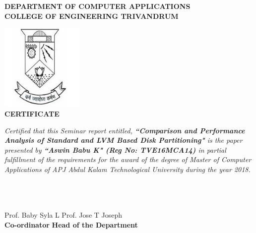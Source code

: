 \begin{titlepage}
\begin{center}
\textbf{DEPARTMENT OF COMPUTER APPLICATIONS}\\[0.5cm]
\textbf{ COLLEGE OF ENGINEERING TRIVANDRUM}\\
[0.5cm]
\vspace{1.2cm}

\includegraphics[width=0.30\textwidth]{./logo}\\
\vspace{0.8cm}
\textbf{CERTIFICATE}\\
\end{center}

\emph{Certified that this Seminar report entitled,
\textbf{``Comparison and Performance Analysis of Standard and LVM Based Disk
Partitioning"} is the paper presented by \textbf{``Aswin Babu K"
(Reg No: TVE16MCA14)} in partial fulfillment of the requirements for the award
of the degree of Master of Computer Applications of APJ Abdul Kalam
Technological University during the year 2018.}\\\\\\\\
\vspace{0.5cm}

Prof. Baby Syla L \hspace{9.5cm} Prof. Jose T Joseph\\ 

\textbf{Co-ordinator}
\hspace{8.9cm} \textbf{Head of the Department}

\end{titlepage}

